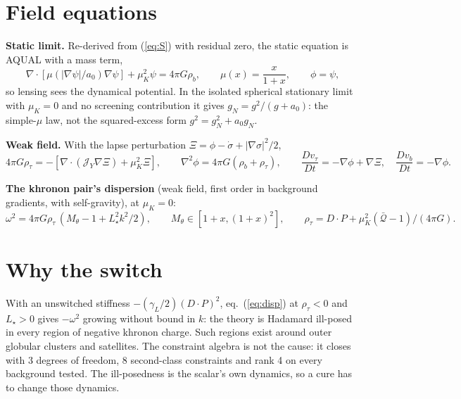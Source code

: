 \documentclass[10pt]{article}
\begin{document}
\section{Field equations}
\textbf{Static limit.} Re-derived from (\ref{eq:S}) with residual zero, the static equation is AQUAL with a mass term,
\begin{equation}
\nabla\!\cdot\![\mu(|\nabla\psi|/a_0)\nabla\psi]+\mu_K^2\psi=4\pi G\rho_b,\qquad \mu(x)=\frac{x}{1+x},\qquad \phi=\psi ,
\end{equation}
so lensing sees the dynamical potential. In the isolated spherical stationary limit with $\mu_K=0$ and no screening contribution it gives $g_N=g^2/(g+a_0)$: the simple-$\mu$ law, not the squared-excess form $g^2=g_N^2+a_0g_N$.

\textbf{Weak field.} With the lapse perturbation $\Xi=\phi-\dot\sigma+|\nabla\sigma|^2/2$,
\begin{equation}
4\pi G\rho_\tau=-[\nabla\!\cdot\!(\mathcal J_Y\nabla\Xi)+\mu_K^2\Xi],\qquad \nabla^2\phi=4\pi G(\rho_b+\rho_\tau),\qquad
\frac{Dv_\tau}{Dt}=-\nabla\phi+\nabla\Xi,\quad \frac{Dv_b}{Dt}=-\nabla\phi .
\end{equation}

\textbf{The khronon pair's dispersion} (weak field, first order in background gradients, with self-gravity), at $\mu_K=0$:
\begin{equation}
\omega^2=4\pi G\rho_\tau\,(M_\theta-1+L_\star^2k^2/2),\qquad M_\theta\in[1+x,(1+x)^2],\qquad \rho_\tau=D\!\cdot\!P+\mu_K^2(\bar{\mathcal Q}-1)/(4\pi G).
\label{eq:disp}
\end{equation}

\section{Why the switch}
With an unswitched stiffness $-(\gamma_L/2)(D\!\cdot\!P)^2$, eq.~(\ref{eq:disp}) at $\rho_\tau<0$ and $L_\star>0$ gives $-\omega^2$ growing without bound in $k$: the theory is Hadamard ill-posed in every region of negative khronon charge. Such regions exist around outer globular clusters and satellites. The constraint algebra is not the cause: it closes with 3 degrees of freedom, 8 second-class constraints and rank 4 on every background tested. The ill-posedness is the scalar's own dynamics, so a cure has to change those dynamics.
\end{document}

